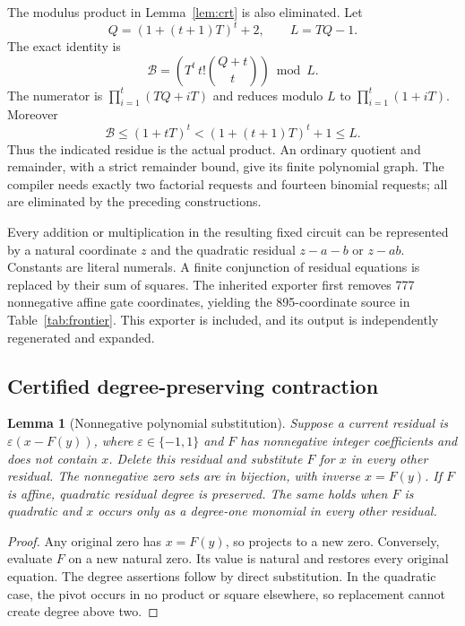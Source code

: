 \documentclass[11pt,letterpaper]{article}
\newtheorem{lemma}[theorem]{Lemma}
\theoremstyle{definition}\newtheorem{definition}[theorem]{Definition}
\theoremstyle{remark}\newtheorem{remark}[theorem]{Remark}
\begin{document}
The modulus product in Lemma~\ref{lem:crt} is also eliminated. Let
\[
 Q=(1+(t+1)T)^t+2,\qquad L=TQ-1.
\]
The exact identity is
\begin{equation}\label{eq:modproduct}
 \mathcal B=\left(T^t\,t!\binom{Q+t}{t}\right)\bmod L.
\end{equation}
The numerator is $\prod_{i=1}^t(TQ+iT)$ and reduces modulo $L$ to
$\prod_{i=1}^t(1+iT)$. Moreover
\[
 \mathcal B\le(1+tT)^t<(1+(t+1)T)^t+1\le L.
\]
Thus the indicated residue is the actual product. An ordinary quotient
and remainder, with a strict remainder bound, give its finite polynomial
graph. The compiler needs exactly two factorial requests and fourteen
binomial requests; all are eliminated by the preceding constructions.

Every addition or multiplication in the resulting fixed circuit can be
represented by a natural coordinate $z$ and the quadratic residual
$z-a-b$ or $z-ab$. Constants are literal numerals. A finite conjunction
of residual equations is replaced by their sum of squares. The inherited
exporter first removes 777 nonnegative affine gate coordinates, yielding
the 895-coordinate source in Table~\ref{tab:frontier}. This exporter is
included, and its output is independently regenerated and expanded.

\subsection{Certified degree-preserving contraction}

\begin{lemma}[Nonnegative polynomial substitution]\label{lem:contract}
Suppose a current residual is $\varepsilon(x-F(y))$, where
$\varepsilon\in\{-1,1\}$ and $F$ has nonnegative integer coefficients
and does not contain $x$. Delete this residual and substitute $F$ for
$x$ in every other residual. The nonnegative zero sets are in bijection,
with inverse $x=F(y)$. If $F$ is affine, quadratic residual degree is
preserved. The same holds when $F$ is quadratic and $x$ occurs only
as a degree-one monomial in every other residual.
\end{lemma}
\begin{proof}
Any original zero has $x=F(y)$, so projects to a new zero. Conversely,
evaluate $F$ on a new natural zero. Its value is natural and restores
every original equation. The degree assertions follow by direct
substitution. In the quadratic case, the pivot occurs in no product
or square elsewhere, so replacement cannot create degree above two.
\end{proof}
\end{document}
